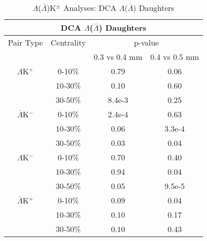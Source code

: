 \documentclass[../AnalysisNoteJBuxton.tex]{subfiles}
\begin{document}
\begin{table}
 \centering
 \begin{tabular}{|c|c|c|c|}
 \multicolumn{4}{c}{DCA $\Lambda$($\bar{\Lambda}$) Daughters} \\
  \hline
  Pair Type & Centrality & \multicolumn{2}{c|}{p-value} \\
  \cline{3-4}
   & & 0.3 vs 0.4 mm & 0.4 vs 0.5 mm \\
  \hline
  $\Lambda$K$^{+}$ & 0-10\% & 0.79 & 0.06 \\
   & 10-30\% & 0.10 & 0.60 \\
   & 30-50\% & 8.4e-3 & 0.25 \\
  \hline
  $\bar{\Lambda}$K$^{-}$ & 0-10\% & 2.4e-4 & 0.63 \\
   & 10-30\% & 0.06 & 3.3e-4 \\
   & 30-50\% & 0.03 & 0.04 \\
  \hline \hline
  $\Lambda$K$^{-}$ & 0-10\% & 0.70 & 0.40 \\
   & 10-30\% & 0.94 & 0.04 \\
   & 30-50\% & 0.05 & 9.5e-5 \\
  \hline
  $\bar{\Lambda}$K$^{+}$ & 0-10\% & 0.09 & 0.04 \\
   & 10-30\% & 0.10 & 0.17 \\
   & 30-50\% & 0.10 & 0.43 \\
  \hline
 \end{tabular}
 \caption{$\Lambda$($\bar{\Lambda}$)K$^{\pm}$ Analyses: DCA $\Lambda$($\bar{\Lambda}$) Daughters}
 \label{tab:LamDaughtersDcaLamKch}
\end{table}
\end{document}
